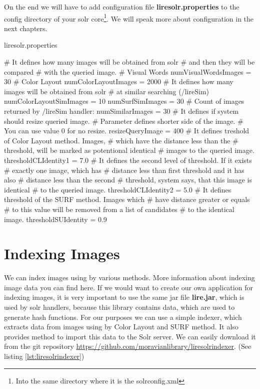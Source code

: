 \documentclass[12pt,a4paper]{report}
\begin{document}
On the end we will have to add configuration file \textbf{liresolr.properties} to the config directory of your solr core\footnote{Into the same directory where it is the solrconfig.xml}. We will speak more about configuration in the next chapters.

\begin{listing}[H]
\caption{liresolr.properties}
\begin{propertiescode}
# It defines how many images will be obtained from solr
# and then they will be compared
# with the queried image.
# Visual Words
numVisualWordsImages = 30
# Color Layout
numColorLayoutImages = 2000
# It defines how many images will be obtained from solr
# at similar searching (/lireSim)
numColorLayoutSimImages = 10
numSurfSimImages = 30
# Count of images returned by /lireSim handler:
numSimilarImages = 30
# It defines if system should resize queried image.
# Parameter defines shorter side of the image.
# You can use value 0 for no resize.
resizeQueryImage = 400
# It defines treshold of Color Layout method. Images,
# which have the distance less than the
# threshold, will be marked as potentional identical
# images to the queried image.
thresholdCLIdentity1 = 7.0
# It defines the second level of threshold. If it exists
# exactly one image, which has
# distance less than first threshold and it has also
# distance less than the second
# threshold, system says, that this image is identical
# to the queried image.
thresholdCLIdentity2 = 5.0
# It defines threshold of the SURF method. Images which
# have distance greater or equals
# to this value will be removed from a list of candidates
# to the identical image.
thresholdSUIdentity = 0.9
\end{propertiescode}
\end{listing}

\section{Indexing Images}

We can index images using by various methods. More information about indexing image data you can find here\cite{createIndex}. If we would want to create our own application for indexing images, it is very important to use the same jar file \textbf{lire.jar}, which is used by solr handlers, because this library contains data, which are used to generate hash functions. For our purposes we can use a simple indexer, which extracts data from images using by Color Layout and SURF method. It also provides method to import this data to the Solr server. We can easily download it from the git repository \url{https://github.com/moravianlibrary/liresolrindexer}. (See listing \ref{lst:liresolrindexer})
\end{document}
